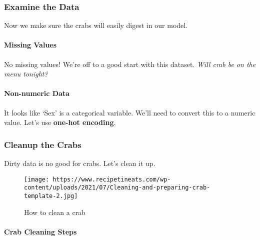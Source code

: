 \documentclass[11pt]{article}
\begin{document}
    \subsubsection{Examine the Data}\label{examine-the-data}

Now we make sure the crabs will easily digest in our model.

\paragraph{Missing Values}\label{missing-values}

No missing values! We're off to a good start with this dataset.
\emph{Will crab be on the menu tonight?}

\paragraph{Non-numeric Data}\label{non-numeric-data}

It looks like `Sex' is a categorical variable. We'll need to convert
this to a numeric value. Let's use \textbf{one-hot encoding}.

    \subsubsection{Cleanup the Crabs}\label{cleanup-the-crabs}

Dirty data is no good for crabs. Let's clean it up.

\begin{figure}
\centering
\texttt{[image: https://www.recipetineats.com/wp-content/uploads/2021/07/Cleaning-and-preparing-crab-template-2.jpg]}
\caption{How to clean a crab}
\end{figure}

\paragraph{Crab Cleaning Steps}\label{crab-cleaning-steps}
\end{document}
